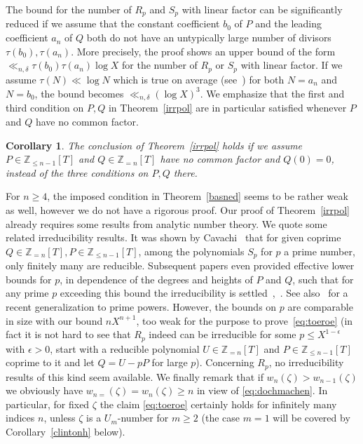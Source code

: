 \documentclass[12pt]{amsart}
\newtheorem{corollary}[theorem]{Corollary}
\theoremstyle{definition}
\begin{document}
The bound for the number of $R_{p}$ and $S_{p}$ with linear factor
can be significantly reduced
if we assume that the constant coefficient $b_{0}$ 
of $P$ and the 
leading coefficient $a_{n}$ of $Q$ both
do not have an untypically large number of divisors $\tau(b_{0}), \tau(a_{n})$. 
More precisely, the proof shows an upper bound
of the form
$\ll_{n,\delta} \tau(b_{0})\tau(a_{n})\log X$ for the number
of $R_{p}$ or $S_{p}$ with linear factor. 
If we assume $\tau(N)\ll \log N$ which is true
on average (see~\cite[Theorem~3.3]{apostol}) for both
$N=a_{n}$ and $N=b_{0}$,
the bound becomes $\ll_{n,\delta} (\log X)^{3}$. 
We emphasize that the first and third 
condition on $P,Q$ in Theorem~\ref{irrpol} are in particular 
satisfied whenever $P$ and $Q$ have no common factor. 

\begin{corollary}
The conclusion of Theorem~\ref{irrpol} holds if we
assume $P\in\mathbb{Z}_{\leq n-1}[T]$ and 
$Q\in\mathbb{Z}_{=n}[T]$ have no common factor and $Q(0)=0$, 
instead of 
the three conditions on $P,Q$ there. 
\end{corollary}


For $n\geq 4$, the imposed condition in Theorem~\ref{basned}
seems to be rather weak as well, however we do not have
a rigorous proof. Our proof of Theorem~\ref{irrpol}
already requires some results from analytic number theory. 
We quote some related irreducibility results.
It was shown by Cavachi~\cite{cav} 
that for given coprime $Q\in\mathbb{Z}_{=n}[T],P\in\mathbb{Z}_{\leq n-1}[T]$, among the polynomials
$S_{p}$ for $p$ a prime number, only finitely many 
are reducible.
Subsequent papers even provided effective
lower bounds for $p$, in dependence of the degrees and heights 
of $P$ and $Q$, such that for any prime $p$ exceeding this bound the 
irreducibility is settled~\cite{cav2},~\cite{bonciocat}. 
See also~\cite{bugagain} for a recent generalization to prime powers. However, the bounds on $p$ are comparable in size with our
bound $nX^{n+1}$, too weak for the 
purpose to prove~\eqref{eq:toeroe} (in fact it
is not hard to see that $R_{p}$ indeed can be irreducible
for some $p\leq X^{1-\epsilon}$ with $\epsilon>0$, start 
with a reducible
polynomial $U\in\mathbb{Z}_{=n}[T]$ and 
$P\in\mathbb{Z}_{\leq n-1}[T]$ coprime to it 
and let $Q=U-pP$ for large $p$). 
Concerning $R_{p}$, 
no irreducibility results of this kind seem available.
We finally remark that if $w_{n}(\zeta)>w_{n-1}(\zeta)$ we obviously
have $w_{n=}(\zeta)=w_{n}(\zeta)\geq n$ in view of \eqref{eq:dochmachen}. 
In particular, for fixed $\zeta$ the claim \eqref{eq:toeroe}
certainly holds for infinitely 
many indices $n$, unless $\zeta$ is a $U_{m}$-number for $m\geq 2$
(the case $m=1$ will be covered by Corollary~\ref{clintonh} below).
\end{document}
